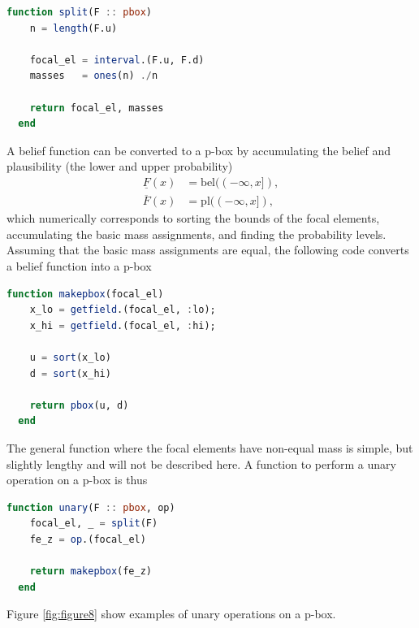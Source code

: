 \documentclass{juliacon}
\begin{document}
\begin{lstlisting}[language = Julia]
  function split(F :: pbox)
    n = length(F.u)

    focal_el = interval.(F.u, F.d)
    masses   = ones(n) ./n

    return focal_el, masses
  end
\end{lstlisting}
\noindent A belief function can be converted to a p-box by accumulating the belief and plausibility (the lower and upper probability)
\begin{align*}
  \underline{F}(x) &= \text{bel}((-\infty, x]),\\ 
  \overline{F}(x) &= \text{pl}((-\infty, x]),
\end{align*}
\noindent which numerically corresponds to sorting the bounds of the focal elements, accumulating the basic mass assignments, and finding the probability levels. Assuming that the basic mass assignments are equal, the following code converts a belief function into a p-box
\begin{lstlisting}[language = Julia]
  function makepbox(focal_el)
    x_lo = getfield.(focal_el, :lo);
    x_hi = getfield.(focal_el, :hi);

    u = sort(x_lo)
    d = sort(x_hi)

    return pbox(u, d)
  end
\end{lstlisting}
\noindent The general function where the focal elements have non-equal mass is simple, but slightly lengthy and will not be described here. A function to perform a unary operation on a p-box is thus
\begin{lstlisting}[language = Julia]
  function unary(F :: pbox, op)
    focal_el, _ = split(F)
    fe_z = op.(focal_el)

    return makepbox(fe_z)
  end
\end{lstlisting}
Figure \ref{fig:figure8} show examples of unary operations on a p-box.
\end{document}
